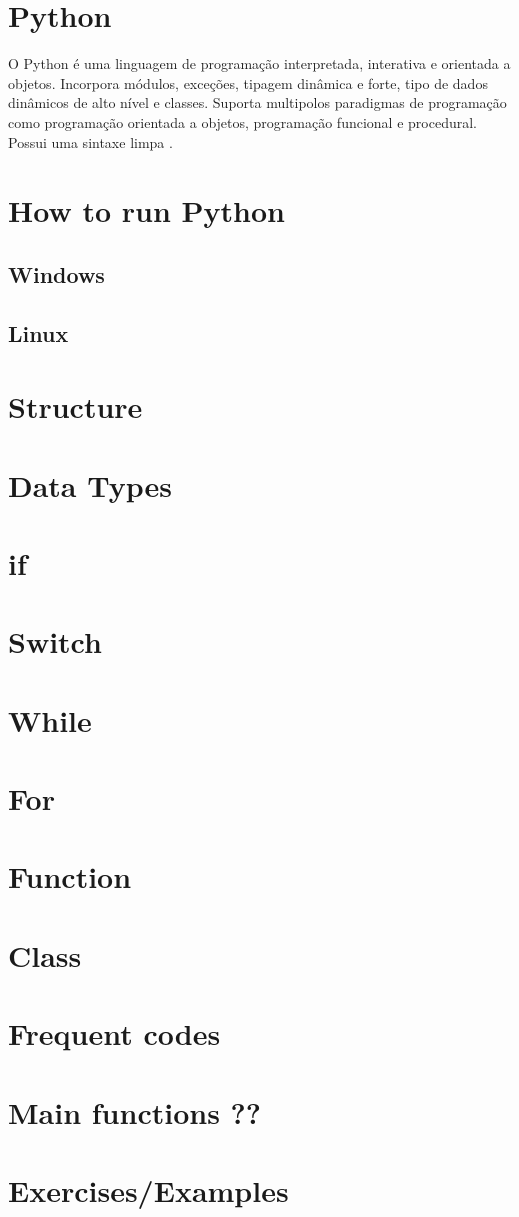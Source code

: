 \chapter{Python}

O Python é uma linguagem de programação interpretada, interativa e orientada a objetos. Incorpora módulos, exceções, tipagem dinâmica e forte, tipo de dados  dinâmicos de alto nível e classes. Suporta multipolos paradigmas de programação como programação orientada a objetos, programação funcional e procedural. Possui uma sintaxe limpa \cite{pythonDocs}.

\chapter{How to run Python}
\section{Windows}
\section{Linux}
\chapter{Structure}
\chapter{Data Types}
\chapter{if}
\chapter{Switch}
\chapter{While}
\chapter{For}
\chapter{Function}
\chapter{Class}
\chapter{Frequent codes}
\chapter{Main functions ??}
\chapter{Exercises/Examples}